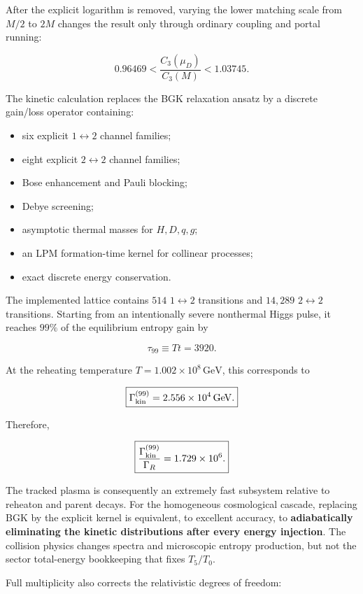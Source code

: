 \documentclass[
  10pt,
]{article}
\providecommand{\tightlist}{%
  \setlength{\itemsep}{0pt}\setlength{\parskip}{0pt}}
\begin{document}
After the explicit logarithm is removed, varying the lower matching
scale from \(M/2\) to \(2M\) changes the result only through ordinary
coupling and portal running:

\[
\boxed{
0.96469
<
\frac{C_3(\mu_D)}{C_3(M)}
<
1.03745.
}
\]

The kinetic calculation replaces the BGK relaxation ansatz by a discrete
gain/loss operator containing:

\begin{itemize}
\tightlist
\item
  six explicit \(1\leftrightarrow2\) channel families;
\item
  eight explicit \(2\leftrightarrow2\) channel families;
\item
  Bose enhancement and Pauli blocking;
\item
  Debye screening;
\item
  asymptotic thermal masses for \(H,D,q,g\);
\item
  an LPM formation-time kernel for collinear processes;
\item
  exact discrete energy conservation.
\end{itemize}

The implemented lattice contains \(514\) \(1\leftrightarrow2\)
transitions and \(14{,}289\) \(2\leftrightarrow2\) transitions. Starting
from an intentionally severe nonthermal Higgs pulse, it reaches \(99\%\)
of the equilibrium entropy gain by

\[
\boxed{
\tau_{99}\equiv Tt=3920.
}
\]

At the reheating temperature \(T=1.002\times10^8\,\mathrm{GeV}\), this
corresponds to

\[
\boxed{
\Gamma_{\rm kin}^{(99)}
=2.556\times10^4\,\mathrm{GeV}.
}
\]

Therefore,

\[
\boxed{
\frac{\Gamma_{\rm kin}^{(99)}}{\Gamma_R}
=1.729\times10^6.
}
\]

The tracked plasma is consequently an extremely fast subsystem relative
to reheaton and parent decays. For the homogeneous cosmological cascade,
replacing BGK by the explicit kernel is equivalent, to excellent
accuracy, to \textbf{adiabatically eliminating the kinetic distributions
after every energy injection}. The collision physics changes spectra and
microscopic entropy production, but not the sector total-energy
bookkeeping that fixes \(T_5/T_0\).

Full multiplicity also corrects the relativistic degrees of freedom:
\end{document}
